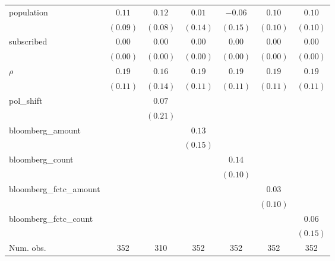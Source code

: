 \begin{table}[!h]
\begin{center}
\begin{tabular}{l c c c c c c }
population              & $0.11$       & $0.12$       & $0.01$       & $-0.06$      & $0.10$       & $0.10$       \\
                        & $(0.09)$     & $(0.08)$     & $(0.14)$     & $(0.15)$     & $(0.10)$     & $(0.10)$     \\
subscribed              & $0.00$       & $0.00$       & $0.00$       & $0.00$       & $0.00$       & $0.00$       \\
                        & $(0.00)$     & $(0.00)$     & $(0.00)$     & $(0.00)$     & $(0.00)$     & $(0.00)$     \\
$\rho$                  & $0.19$       & $0.16$       & $0.19$       & $0.19$       & $0.19$       & $0.19$       \\
                        & $(0.11)$     & $(0.14)$     & $(0.11)$     & $(0.11)$     & $(0.11)$     & $(0.11)$     \\
pol\_shift              &              & $0.07$       &              &              &              &              \\
                        &              & $(0.21)$     &              &              &              &              \\
bloomberg\_amount       &              &              & $0.13$       &              &              &              \\
                        &              &              & $(0.15)$     &              &              &              \\
bloomberg\_count        &              &              &              & $0.14$       &              &              \\
                        &              &              &              & $(0.10)$     &              &              \\
bloomberg\_fctc\_amount &              &              &              &              & $0.03$       &              \\
                        &              &              &              &              & $(0.10)$     &              \\
bloomberg\_fctc\_count  &              &              &              &              &              & $0.06$       \\
                        &              &              &              &              &              & $(0.15)$     \\
\midrule
Num. obs.               & 352          & 310          & 352          & 352          & 352          & 352          \\

\end{tabular}
\end{center}
\end{table}
